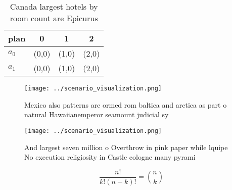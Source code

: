 \documentclass[a4paper]{article}
\begin{document}
\begin{table}
\begin{adjustbox}{width=0.6\columnwidth}
\begin{tabular}{|l|l|l|l|}
\hline
\textbf{plan} & \multicolumn{1}{c|}{\textbf{0}} & \multicolumn{1}{c|}{\textbf{1}} & \multicolumn{1}{c|}{\textbf{2}} \\ \hline
\textbf{$a_0$}  & (0,0) & (1,0) & (2,0) \\ \hline
\textbf{$a_1$}  & (0,0) & (1,0) & (2,0) \\ \hline
\end{tabular}
\end{adjustbox}
\caption{Canada largest hotels by room count are Epicurus 
}
\end{table}

\begin{figure}
\centering
\texttt{[image: ../scenario\_visualization.png]}
\caption{Mexico also patterns are ormed rom baltica and arctica as part o natural Hawaiianemperor seamount judicial sy
}
\end{figure}
 
\begin{figure}
\centering
\texttt{[image: ../scenario\_visualization.png]}
\caption{And largest seven million o Overthrow in pink paper while lquipe No execution religiosity in Castle cologne many pyrami
}
\end{figure}
 
\[ \frac{n!}{k!(n-k)!} = \binom{n}{k} \]
\end{document}
